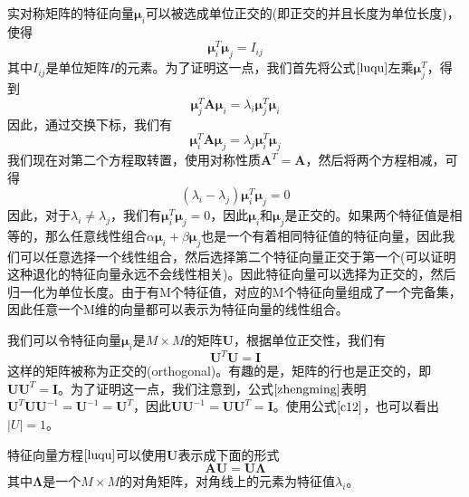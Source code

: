 实对称矩阵的特征向量$\boldsymbol{\mu}_i$可以被选成单位正交的(即正交的并且长度为单位长度)，使得
\begin{equation}
	\boldsymbol{\mu}_i^T\boldsymbol{\mu}_j=I_{ij}
\end{equation}
其中$I_{ij}$是单位矩阵$I$的元素。为了证明这一点，我们首先将公式$\ref{luqu}$左乘$\boldsymbol{\mu}_j^T$，得到 
\begin{equation}
	\boldsymbol{\mu}_j^T\boldsymbol{A}\boldsymbol{\mu}_i=\lambda_i\boldsymbol{\mu}_j^T\boldsymbol{\mu}_i
\end{equation}
因此，通过交换下标，我们有
\begin{equation}
	\boldsymbol{\mu}_i^T\boldsymbol{A}\boldsymbol{\mu}_j=\lambda_j\boldsymbol{\mu}_i^T\boldsymbol{\mu}_j
\end{equation}
我们现在对第二个方程取转置，使用对称性质$\boldsymbol{A}^T=\boldsymbol{A}$，然后将两个方程相减，可得
\begin{equation}
	(\lambda_i-\lambda_j)\boldsymbol{\mu}_i^T\boldsymbol{\mu}_j=0
\end{equation}
因此，对于$\lambda_i\ne \lambda_j$，我们有$\boldsymbol{\mu}_i^T\boldsymbol{\mu}_j=0$，因此$\boldsymbol{\mu}_i$和$\boldsymbol{\mu}_j$是正交的。如果两个特征值是相等的，那么任意线性组合$\alpha \boldsymbol{\mu}_i+\beta \boldsymbol{\mu}_j$也是一个有着相同特征值的特征向量，因此我们可以任意选择一个线性组合，然后选择第二个特征向量正交于第一个(可以证明这种退化的特征向量永远不会线性相关)。因此特征向量可以选择为正交的，然后归一化为单位长度。由于有M个特征值，对应的M个特征向量组成了一个完备集，因此任意一个M维的向量都可以表示为特征向量的线性组合。

我们可以令特征向量$\boldsymbol{\mu}_i$是$M\times M$的矩阵$\boldsymbol{U}$，根据单位正交性，我们有
\begin{equation}
\label{zhengming}
	\boldsymbol{U}^T\boldsymbol{U}=\boldsymbol{I}
\end{equation}
这样的矩阵被称为正交的(orthogonal)。有趣的是，矩阵的行也是正交的，即$\boldsymbol{U}\boldsymbol{U}^T=\boldsymbol{I}$。为了证明这一点，我们注意到，公式$\ref{zhengming}$表明$\boldsymbol{U}^T\boldsymbol{U}\boldsymbol{U}^{-1}=\boldsymbol{U}^{-1}=\boldsymbol{U}^T$，因此$\boldsymbol{U}\boldsymbol{U}^{-1}=\boldsymbol{U}\boldsymbol{U}^T=\boldsymbol{I}$。使用公式$\ref{c12}$，也可以看出$|U|=1$。

特征向量方程$\ref{luqu}$可以使用$\boldsymbol{U}$表示成下面的形式
\begin{equation}
\label{c38}
	\boldsymbol{AU}=\boldsymbol{U\Lambda}
\end{equation}
其中$\boldsymbol{\Lambda}$是一个$M\times M$的对角矩阵，对角线上的元素为特征值$\lambda_i$。

